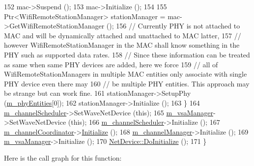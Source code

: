 \begin{DoxyCode}
152       mac->Suspend ();
153       mac->Initialize ();
154 
155       Ptr<WifiRemoteStationManager> stationManager = mac->GetWifiRemoteStationManager ();
156       \textcolor{comment}{// Currently PHY is not attached to MAC and will be dynamically attached and unattached to MAC
       latter,}
157       \textcolor{comment}{// however WifiRemoteStationManager in the MAC shall know something  in the PHY such as supported
       data rates.}
158       \textcolor{comment}{// Since these information can be treated as same when same PHY devices are added, here we force}
159       \textcolor{comment}{// all of WifiRemoteStationManagers in multiple MAC entities only associate with single PHY device
       even there may}
160       \textcolor{comment}{// be multiple PHY entities. This approach may be strange but can work fine.}
161       stationManager->SetupPhy (\hyperlink{classns3_1_1WaveNetDevice_a60401868abeed63f3218b78c076534a8}{m\_phyEntities}[0]);
162       stationManager->Initialize ();
163     \}
164   \hyperlink{classns3_1_1WaveNetDevice_a64edd74de0dc4af431f2d08aad19a9d1}{m\_channelScheduler}->SetWaveNetDevice (\textcolor{keyword}{this});
165   \hyperlink{classns3_1_1WaveNetDevice_a3bec7791c4e2ffc4609e7bf1b75b07b7}{m\_vsaManager}->SetWaveNetDevice (\textcolor{keyword}{this});
166   \hyperlink{classns3_1_1WaveNetDevice_a64edd74de0dc4af431f2d08aad19a9d1}{m\_channelScheduler}->Initialize ();
167   \hyperlink{classns3_1_1WaveNetDevice_ab05beb5d2cd120f6b81ab100628c1912}{m\_channelCoordinator}->\hyperlink{classns3_1_1Object_af4411cb29971772fcd09203474a95078}{Initialize} ();
168   \hyperlink{classns3_1_1WaveNetDevice_ae9970c62630b78bc09d4d4a16cb55ff8}{m\_channelManager}->Initialize ();
169   \hyperlink{classns3_1_1WaveNetDevice_a3bec7791c4e2ffc4609e7bf1b75b07b7}{m\_vsaManager}->Initialize ();
170   \hyperlink{classns3_1_1Object_af8482a521433409fb5c7f749398c9dbe}{NetDevice::DoInitialize} ();
171 \}
\end{DoxyCode}


Here is the call graph for this function\+:


